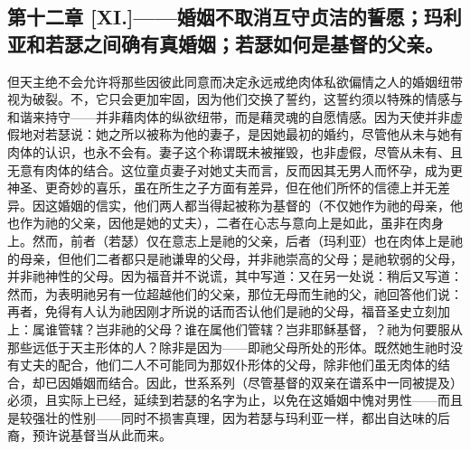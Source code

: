 
\subsection{第十二章 [XI.]——婚姻不取消互守贞洁的誓愿；玛利亚和若瑟之间确有真婚姻；若瑟如何是基督的父亲。}

但天主绝不会允许将那些因彼此同意而决定永远戒绝肉体私欲偏情之人的婚姻纽带视为破裂。不，它只会更加牢固，因为他们交换了誓约，这誓约须以特殊的情感与和谐来持守——并非藉肉体的纵欲纽带，而是藉灵魂的自愿情感。因为天使并非虚假地对若瑟说：她之所以被称为他的妻子，是因她最初的婚约，尽管他从未与她有肉体的认识，也永不会有。妻子这个称谓既未被摧毁，也非虚假，尽管从未有、且无意有肉体的结合。这位童贞妻子对她丈夫而言，反而因其无男人而怀孕，成为更神圣、更奇妙的喜乐，虽在所生之子方面有差异，但在他们所怀的信德上并无差异。因这婚姻的信实，他们两人都当得起被称为基督的（不仅她作为祂的母亲，他也作为祂的父亲，因他是她的丈夫），二者在心志与意向上是如此，虽非在肉身上。然而，前者（若瑟）仅在意志上是祂的父亲，后者（玛利亚）也在肉体上是祂的母亲，但他们二者都只是祂谦卑的父母，并非祂崇高的父母；是祂软弱的父母，并非祂神性的父母。因为福音并不说谎，其中写道：又在另一处说：稍后又写道：然而，为表明祂另有一位超越他们的父亲，那位无母而生祂的父，祂回答他们说：再者，免得有人认为祂因刚才所说的话而否认他们是祂的父母，福音圣史立刻加上：属谁管辖？岂非祂的父母？谁在属他们管辖？岂非耶稣基督，？祂为何要服从那些远低于天主形体的人？除非是因为——即祂父母所处的形体。既然她生祂时没有丈夫的配合，他们二人不可能同为那奴仆形体的父母，除非他们虽无肉体的结合，却已因婚姻而结合。因此，世系系列（尽管基督的双亲在谱系中一同被提及）必须，且实际上已经，延续到若瑟的名字为止，以免在这婚姻中愧对男性——而且是较强壮的性别——同时不损害真理，因为若瑟与玛利亚一样，都出自达味的后裔，预许说基督当从此而来。\par


